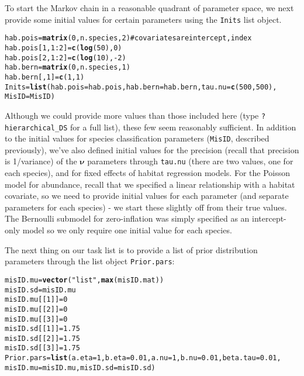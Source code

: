 \documentclass{article}\usepackage{graphicx, color}
\makeatletter
\newcommand{\hlfunctioncall}[1]{\textcolor[rgb]{0.501960784313725,0,0.329411764705882}{\textbf{#1}}}%
\newcommand{\hlstring}[1]{\textcolor[rgb]{0.6,0.6,1}{#1}}%
\newcommand{\hlcomment}[1]{\textcolor[rgb]{0.180392156862745,0.6,0.341176470588235}{#1}}%
\newenvironment{kframe}{%
 \def\at@end@of@kframe{}%
 \ifinner\ifhmode%
  \def\at@end@of@kframe{\end{minipage}}%
  \begin{minipage}{\columnwidth}%
 \fi\fi%
 \def\FrameCommand##1{\hskip\@totalleftmargin \hskip-\fboxsep
 \colorbox{shadecolor}{##1}\hskip-\fboxsep
     \hskip-\linewidth \hskip-\@totalleftmargin \hskip\columnwidth}%
 \MakeFramed {\advance\hsize-\width
   \@totalleftmargin\z@ \linewidth\hsize
   \@setminipage}}%
 {\par\unskip\endMakeFramed%
 \at@end@of@kframe}
\newenvironment{knitrout}{}{} %
\makeatother
\begin{document}
To start the Markov chain in a reasonable quadrant of parameter space, we next
provide some initial values for certain parameters using the \texttt{Inits} list
object.  
\begin{knitrout}
\color{fgcolor}\begin{kframe}
\begin{alltt}
hab.pois = \hlfunctioncall{matrix}(0, n.species, 2)  \hlcomment{#covariates are intercept, index}
hab.pois[1, 1:2] = \hlfunctioncall{c}(\hlfunctioncall{log}(50), 0)
hab.pois[2, 1:2] = \hlfunctioncall{c}(\hlfunctioncall{log}(10), -2)
hab.bern = \hlfunctioncall{matrix}(0, n.species, 1)
hab.bern[, 1] = \hlfunctioncall{c}(1, 1)
Inits = \hlfunctioncall{list}(hab.pois = hab.pois, hab.bern = hab.bern, tau.nu = \hlfunctioncall{c}(500, 500), 
    MisID = MisID)
\end{alltt}
\end{kframe}
\end{knitrout}

Although we could provide more values than those included here (type \texttt{? hierarchical\_DS} for a full list), these few seem reasonably sufficient.  In addition to the initial values for species classification parameters (\texttt{MisID}, described previously), we've also defined initial values for the precision (recall that precision is 1/variance) of the $\boldsymbol{\nu}$ parameters through \texttt{tau.nu} (there are two values, one for each species), and for fixed effects of habitat regression models.  For the Poisson model for abundance, recall that we
specified a linear relationship with a habitat covariate, so we need to provide initial values for each parameter (and separate parameters for each species) - we start these slightly off from their true values.  The Bernoulli submodel for zero-inflation was simply specified as an intercept-only model so we only require one initial value for each species.

The next thing on our task list is to provide a list of prior distribution parameters through the list object \texttt{Prior.pars}:

\begin{knitrout}
\color{fgcolor}\begin{kframe}
\begin{alltt}
misID.mu = \hlfunctioncall{vector}(\hlstring{"list"}, \hlfunctioncall{max}(misID.mat))
misID.sd = misID.mu
misID.mu[[1]] = 0
misID.mu[[2]] = 0
misID.mu[[3]] = 0
misID.sd[[1]] = 1.75
misID.sd[[2]] = 1.75
misID.sd[[3]] = 1.75
Prior.pars = \hlfunctioncall{list}(a.eta = 1, b.eta = 0.01, a.nu = 1, b.nu = 0.01, beta.tau = 0.01, 
    misID.mu = misID.mu, misID.sd = misID.sd)
\end{alltt}
\end{kframe}
\end{knitrout}
\end{document}
